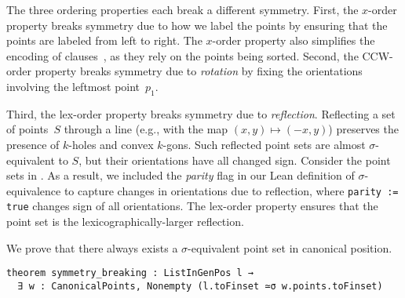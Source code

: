 The three ordering properties each break a different symmetry.
First, the $x$-order property breaks symmetry due to how we label the points by ensuring that the points are labeled from left to right.
The $x$-order property also simplifies the encoding of clauses~,
as they rely on the points being sorted.
Second, the CCW-order property breaks symmetry due to \emph{rotation} by fixing the orientations involving the leftmost point~$p_1$.



Third, the lex-order property breaks symmetry due to \emph{reflection}.
Reflecting a set of points~$S$ through a line (e.g., with the map $(x, y) \mapsto (-x, y)$)
preserves the presence of $k$-holes and convex $k$-gons.
Such reflected point sets are almost $\sigma$-equivalent to $S$,
but their orientations have all changed sign.
Consider the point sets in .
As a result,
we included the \emph{parity} flag in our Lean definition of $\sigma$-equivalence
to capture changes in orientations due to reflection,
where \lstinline|parity := true| changes sign of all orientations.
The lex-order property ensures that the point set is the lexicographically-larger reflection.

We prove that there always exists a $\sigma$-equivalent point set in canonical position.


\begin{lstlisting}
theorem symmetry_breaking : ListInGenPos l →
  ∃ w : CanonicalPoints, Nonempty (l.toFinset ≃σ w.points.toFinset)
\end{lstlisting}


